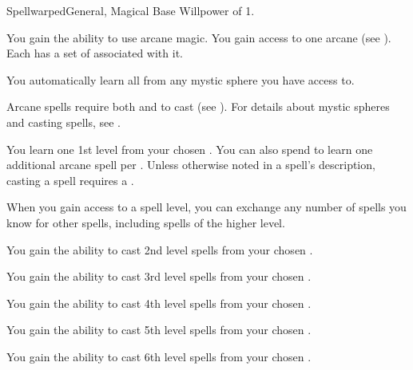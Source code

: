     \begin{feat}{Spellwarped}{General, Magical}
        \featpre Base Willpower of 1.

         You gain the ability to use arcane magic.
        You gain access to one arcane  (see ).
        Each  has a set of  associated with it.

        You automatically learn all  from any mystic sphere you have access to.

        Arcane spells require both  and  to cast (see ).
        For details about mystic spheres and casting spells, see .

         You learn one 1st level  from your chosen .
        You can also spend  to learn one additional arcane spell per .
        Unless otherwise noted in a spell's description, casting a spell requires a .

        When you gain access to a spell level,
            you can exchange any number of spells you know for other spells,
            including spells of the higher level.

         You gain the ability to cast 2nd level spells from your chosen .

         You gain the ability to cast 3rd level spells from your chosen .

         You gain the ability to cast 4th level spells from your chosen .

         You gain the ability to cast 5th level spells from your chosen .

         You gain the ability to cast 6th level spells from your chosen .
    \end{feat}


